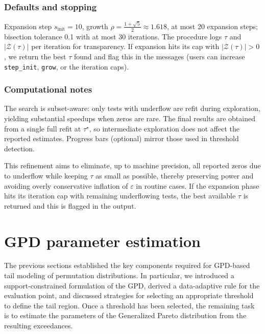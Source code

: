 \subsubsection*{Defaults and stopping}
Expansion step $s_{\text{init}}=10$, growth $\rho=\frac{1+\sqrt5}{2}\approx1.618$, at most 20 expansion steps; bisection tolerance 0.1 with at most 30 iterations. The procedure logs $\tau$ and $|\mathcal Z(\tau)|$ per iteration for transparency. If expansion hits its cap with $|\mathcal Z(\tau)|>0$, we return the best $\tau$ found and flag this in the messages (users can increase \texttt{step\_init}, \texttt{grow}, or the iteration caps).

\subsubsection*{Computational notes}
The search is subset-aware: only tests with underflow are refit during exploration, yielding substantial speedups when zeros are rare. The final results are obtained from a single full refit at $\tau^\star$, so intermediate exploration does not affect the reported estimates. Progress bars (optional) mirror those used in threshold detection.

This refinement aims to eliminate, up to machine precision, all reported zeros due to underflow while keeping $\tau$ as small as possible, thereby preserving power and avoiding overly conservative inflation of $\varepsilon$ in routine cases. If the expansion phase hits its iteration cap with remaining underflowing tests, the best available $\tau$ is returned and this is flagged in the output.



\section{GPD parameter estimation}
\label{sec:6perm:param_est}

The previous sections established the key components required for GPD-based tail modeling of permutation distributions. In particular, we introduced a support-constrained formulation of the GPD, derived a data-adaptive rule for the evaluation point, and discussed strategies for selecting an appropriate threshold to define the tail region. Once a threshold has been selected, the remaining task is to estimate the parameters of the Generalized Pareto distribution from the resulting exceedances.

